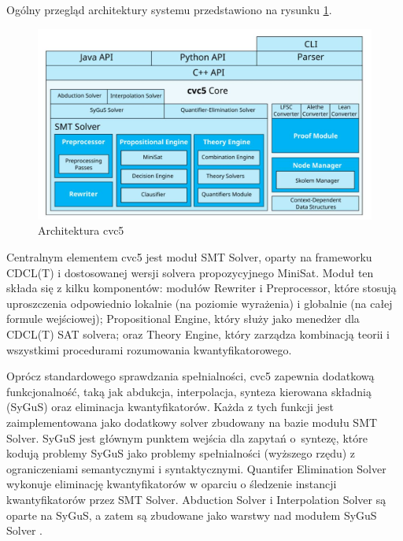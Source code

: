 Ogólny przegląd architektury systemu przedstawiono na rysunku \ref{fig:cvc5}.

\begin{figure}[htbp]
	\centering
	\begin{minipage}{\textwidth}
		\includegraphics[width=\textwidth]{./figures/cvc5_architecture}
		\caption{Architektura cvc5}
		\label{fig:cvc5}
	\end{minipage}
\end{figure}

Centralnym elementem cvc5 jest moduł SMT Solver, oparty na frameworku CDCL(T) \cite{NieuwenhuisOT06} i dostosowanej wersji solvera propozycyjnego MiniSat. Moduł ten składa się z kilku komponentów: modułów Rewriter i Preprocessor, które stosują uproszczenia odpowiednio lokalnie (na poziomie wyrażenia) i globalnie (na całej formule wejściowej); Propositional Engine, który służy jako menedżer dla CDCL(T) SAT solvera; oraz Theory Engine, który zarządza kombinacją teorii i wszystkimi procedurami rozumowania kwantyfikatorowego.

Oprócz standardowego sprawdzania spełnialności, cvc5 zapewnia dodatkową funkcjonalność, taką jak abdukcja, interpolacja, synteza kierowana składnią (SyGuS) oraz eliminacja kwantyfikatorów. Każda z tych funkcji jest zaimplementowana jako dodatkowy solver zbudowany na bazie modułu SMT Solver. SyGuS jest głównym punktem wejścia
dla zapytań o~syntezę, które kodują problemy SyGuS jako problemy spełnialności (wyższego rzędu) z ograniczeniami semantycznymi i syntaktycznymi. Quantifer Elimination Solver wykonuje eliminację kwantyfikatorów w oparciu o śledzenie instancji kwantyfikatorów przez SMT Solver. Abduction Solver i Interpolation Solver są oparte na SyGuS, a zatem są zbudowane jako warstwy nad modułem SyGuS Solver \cite{BarbosaBBKLMMMN22}.

